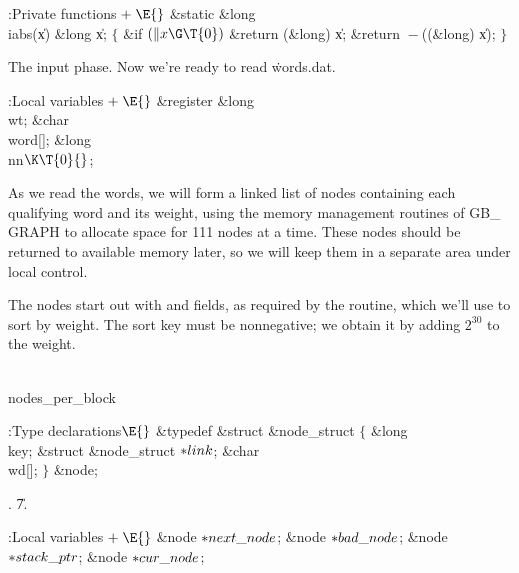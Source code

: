 \B{}:Private functions\X${}\mathrel+\E{}$\6
\1\1\&{static} \&{long} \\{iabs}(\|x)\6
\&{long} \|x;\2\2\6
${}\{{}$\5
\1\&{if} ${}(\|x\G\T{0}){}$\1\5
\&{return} (\&{long}) \|x;\2\6
\&{return} ${}{-}{}$((\&{long}) \|x);\6
\4${}\}{}$\2\par
\fi

The input phase. Now we're ready to read \.{words.dat}.

\Y\B\4:Local variables\X${}\mathrel+\E{}$\6
\&{register} \&{long} \\{wt};\6
\&{char} \\{word}[];\6
\&{long} \\{nn}${}\K\T{0}{}$;%
\par
\fi

As we read the words, we will form a linked list of nodes containing
each qualifying word and its weight, using the memory management
routines of {\sc GB\_\,GRAPH} to allocate space for 111 nodes at a
time. These nodes should be returned to available memory later, so we
will keep them in a separate area under local control.

The nodes start out with  and  fields, as required by
the
 routine, which we'll use to sort by weight. The sort key
must be
nonnegative; we obtain it by adding $2^{30}$ to the weight.

\Y\B\4\D\\{nodes\_per\_block}\5
\par
\Y\B\4:Type declarations\X${}\E{}$\6
\&{typedef} \&{struct} \&{node\_struct} ${}\{{}$\1\6
\&{long} \\{key};\6
\&{struct} \&{node\_struct} ${}{*}\\{link}{}$;\6
\&{char} \\{wd}[];\2\6
${}\}{}$ \&{node};\par
{}.
\U7.\fi

\B{}:Local variables\X${}\mathrel+\E{}$\6
\&{node} ${}{*}\\{next\_node}{}$;\6
\&{node} ${}{*}\\{bad\_node}{}$;\6
\&{node} ${}{*}\\{stack\_ptr}{}$;\6
\&{node} ${}{*}\\{cur\_node}{}$;\par
\fi

